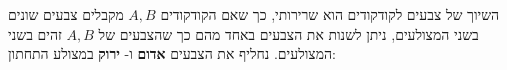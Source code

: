 %
%  
%
%
%
%
%
%  
%
%
%
השיוך של צבעים לקודקודים הוא שרירותי, כך שאם הקודקודים 
$A,B$
מקבלים צבעים שונים בשני המצולעים, ניתן לשנות את הצבעים באחד מהם כך שהצבעים של 
$A,B$
זהים בשני המצולעים. נחליף את הצבעים
\textbf{אדום}
ו-%
\textbf{ירוק}
במצולע התחתון:

